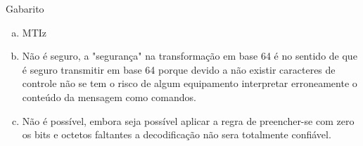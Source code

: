 \documentclass[10pt,a4paper]{beamer}
\author{Welson Jr}
\begin{document}
\begin{frame}{Gabarito}

\begin{enumerate}[(a)]
\item MTIz
\item Não é seguro, a "segurança" na transformação em base 64 é no sentido de que é seguro transmitir em base 64 porque devido a não existir caracteres de controle não se tem o risco de algum equipamento interpretar erroneamente o conteúdo da mensagem como comandos.
\item Não é possível, embora seja possível aplicar a regra de preencher-se com zero os bits e octetos faltantes a decodificação não sera totalmente confiável.
\end{enumerate}
\end{frame}
\end{document}

